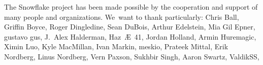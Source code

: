 \documentclass[letterpaper,twocolumn]{article}
\begin{document}
The Snowflake project has been made possible
by the cooperation and support of many people
and organizations.
We~want to thank particularly:
Chris Ball, %
Griffin Boyce, %
Roger Dingledine, %
Sean DuBois, %
Arthur Edelstein, %
Mia Gil Epner, %
gustavo gus, %
J.~Alex Halderman,
Haz~Æ~41, %
Jordan Holland, %
Armin Huremagic, %
Ximin Luo, %
Kyle MacMillan, %
Ivan Markin, %
meskio, %
Prateek Mittal, %
Erik Nordberg, %
Linus Nordberg, %
Vern Paxson, %
Sukhbir Singh, %
Aaron Swartz,
ValdikSS, %
\end{document}
